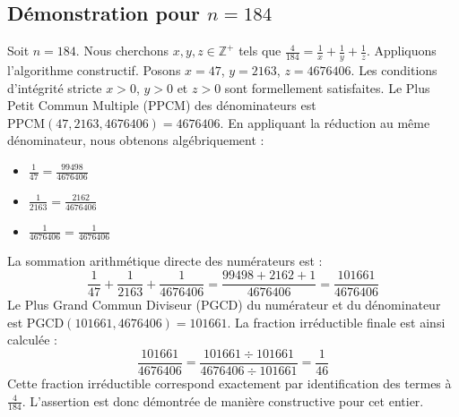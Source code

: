\documentclass[11pt,a4paper]{article}
\begin{document}
\subsection{Démonstration pour $n = 184$}
Soit $n = 184$. Nous cherchons $x, y, z \in \mathbb{Z}^{+}$ tels que $\frac{4}{184} = \frac{1}{x} + \frac{1}{y} + \frac{1}{z}$.
Appliquons l'algorithme constructif. Posons $x = 47$, $y = 2163$, $z = 4676406$.
Les conditions d'intégrité stricte $x > 0$, $y > 0$ et $z > 0$ sont formellement satisfaites.
Le Plus Petit Commun Multiple (PPCM) des dénominateurs est $\text{PPCM}(47, 2163, 4676406) = 4676406$.
En appliquant la réduction au même dénominateur, nous obtenons algébriquement :
\begin{itemize}
    \item $\frac{1}{47} = \frac{99498}{4676406}$
    \item $\frac{1}{2163} = \frac{2162}{4676406}$
    \item $\frac{1}{4676406} = \frac{1}{4676406}$
\end{itemize}
La sommation arithmétique directe des numérateurs est :
$$ \frac{1}{47} + \frac{1}{2163} + \frac{1}{4676406} = \frac{99498 + 2162 + 1}{4676406} = \frac{101661}{4676406} $$
Le Plus Grand Commun Diviseur (PGCD) du numérateur et du dénominateur est $\text{PGCD}(101661, 4676406) = 101661$.
La fraction irréductible finale est ainsi calculée :
$$ \frac{101661}{4676406} = \frac{101661 \div 101661}{4676406 \div 101661} = \frac{1}{46} $$
Cette fraction irréductible correspond exactement par identification des termes à $\frac{4}{184}$. L'assertion est donc démontrée de manière constructive pour cet entier.
\end{document}
